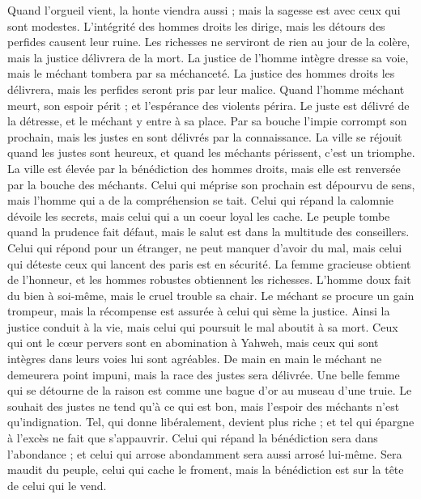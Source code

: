 \begin{multicols}{2}
Quand l'orgueil vient, la honte viendra aussi ; mais la sagesse est avec ceux qui sont modestes.
L'intégrité des hommes droits les dirige, mais les détours des perfides causent leur ruine.
Les richesses ne serviront de rien au jour de la colère, mais la justice délivrera de la mort.
La justice de l'homme intègre dresse sa voie, mais le méchant tombera par sa méchanceté.
La justice des hommes droits les délivrera, mais les perfides seront pris par leur malice.
Quand l’homme méchant meurt, son espoir périt ; et l'espérance des violents périra.
Le juste est délivré de la détresse, et le méchant y entre à sa place.
Par sa bouche l’impie corrompt son prochain, mais les justes en sont délivrés par la connaissance.
La ville se réjouit quand les justes sont heureux, et quand les méchants périssent, c’est un triomphe.
La ville est élevée par la bénédiction des hommes droits, mais elle est renversée par la bouche des méchants.
Celui qui méprise son prochain est dépourvu de sens, mais l'homme qui a de la compréhension se tait.
Celui qui répand la calomnie dévoile les secrets, mais celui qui a un coeur loyal les cache.
Le peuple tombe quand la prudence fait défaut, mais le salut est dans la multitude des conseillers.
Celui qui répond pour un étranger, ne peut manquer d'avoir du mal, mais celui qui déteste ceux qui lancent des paris est en sécurité.
La femme gracieuse obtient de l'honneur, et les hommes robustes obtiennent les richesses.
L'homme doux fait du bien à soi-même, mais le cruel trouble sa chair.
Le méchant se procure un gain trompeur, mais la récompense est assurée à celui qui sème la justice.
Ainsi la justice conduit à la vie, mais celui qui poursuit le mal aboutit à sa mort.
Ceux qui ont le cœur pervers sont en abomination à Yahweh, mais ceux qui sont intègres dans leurs voies lui sont agréables.
De main en main le méchant ne demeurera point impuni, mais la race des justes sera délivrée.
Une belle femme qui se détourne de la raison est comme une bague d'or au museau d'une truie.
Le souhait des justes ne tend qu’à ce qui est bon, mais l'espoir des méchants n'est qu'indignation.
Tel, qui donne libéralement, devient plus riche ; et tel qui épargne à l’excès ne fait que s’appauvrir.
Celui qui répand la bénédiction sera dans l’abondance ; et celui qui arrose abondamment sera aussi arrosé lui-même.
Sera maudit du peuple, celui qui cache le froment, mais la bénédiction est sur la tête de celui qui le vend.

\end{multicols}
